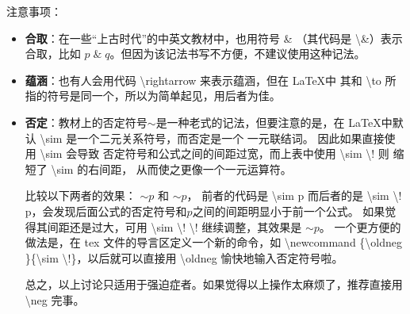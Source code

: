 \documentclass[UTF8,12pt,a4paper]{ctexart}
\begin{document}
注意事项：
\begin{itemize}
	\item \textbf{合取}：在一些“上古时代”的中英文教材中，也用符号 \& （其代码是 \textbackslash \&）表示合取，比如 $p \;\&\; q$。但因为该记法书写不方便，不建议使用这种记法。
	
	\item \textbf{蕴涵}：也有人会用代码 \textbackslash rightarrow 来表示蕴涵，但在 \LaTeX 中
	其和 \textbackslash to 所指的符号是同一个，所以为简单起见，用后者为佳。
	
	\item \textbf{否定}：教材上的否定符号$\sim$是一种老式的记法，但要注意的是，在 \LaTeX 中默认 \textbackslash sim 是一个二元关系符号，而否定是一个{\color{red} 一元}联结词。
	因此如果直接使用 \textbackslash sim 会导致 否定符号和公式之间的间距过宽，而上表中使用 \textbackslash sim \textbackslash! 则 缩短了 \textbackslash sim  的右间距，
	从而使之更像一个一元运算符。
	
	比较以下两者的效果：
	$\sim p$ 和 $\sim\! p$，
	前者的代码是 \textbackslash sim p  而后者的是 \textbackslash sim \textbackslash! p，会发现后面公式的否定符号和$p$之间的间距明显小于前一个公式。
	如果觉得其间距还是过大，可用 \textbackslash sim \textbackslash! \textbackslash! 继续调整，其效果是 $\sim\!\! p$。 一个更方便的做法是，在 tex 文件的导言区定义一个新的命令，如 \textbackslash newcommand \{\textbackslash oldneg \}\{\textbackslash sim \textbackslash!\}，以后就可以直接用 \textbackslash oldneg 愉快地输入否定符号啦。
	
	总之，以上讨论只适用于强迫症者。如果觉得以上操作太麻烦了，推荐直接用 \textbackslash neg 完事。
\end{itemize}




















\end{document}
